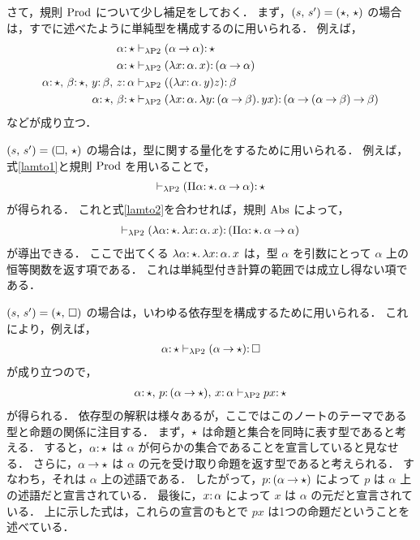 \documentclass[./main]{subfiles}
\begin{document}
さて，規則 $ \mathop{\mathrm{Prod}}\nolimits $ について少し補足をしておく．
まず，$ (s,\, s') = (\mathord{\star},\, \mathord{\star}) $ の場合は，すでに述べたように単純型を構成するのに用いられる．
例えば，
\begin{align}
\alpha \ocl\, \typstar & \vdash _{\lam \mathrm{P2}} (\alpha \bto \alpha) \ocl\, \typstar \label{lamto1} \\
\alpha \ocl\, \typstar & \vdash _{\lam \mathrm{P2}} (\lam x \ocl\, \alpha.\, x) \ocl\, (\alpha \bto \alpha) \label{lamto2} \\
\alpha \ocl\, \typstar,\ats \beta \ocl\, \typstar,\ats y \ocl\, \beta,\ats z \ocl\, \alpha & \vdash _{\lam \mathrm{P2}} ((\lam x \ocl\, \alpha.\, y) z) \ocl\, \beta \notag \\
\alpha \ocl\, \typstar,\ats \beta \ocl\, \typstar & \vdash _{\lam \mathrm{P2}} (\lam x \ocl\, \alpha.\, \lam y \ocl\, (\alpha \bto \beta).\, yx) \ocl\, (\alpha \bto (\alpha \bto \beta) \bto \beta) \notag
\end{align}
などが成り立つ．

$ (s,\, s') = (\mathord{\square},\, \mathord{\star}) $ の場合は，型に関する量化をするために用いられる．
例えば，式\ref{lamto1}と規則 $ \mathop{\mathrm{Prod}}\nolimits $ を用いることで，
\begin{gather*}
\vdash _{\lam \mathrm{P2}} (\Pi \alpha \ocl\, \typstar.\, \alpha \bto \alpha) \ocl\, \typstar \label{quanttype}
\end{gather*}
が得られる．
これと式\ref{lamto2}を合わせれば，規則 $ \mathop{\mathrm{Abs}}\nolimits $ によって，
\begin{gather*}
\vdash _{\lambda \mathrm{P2}} (\lambda \alpha \mathord{:}\, \mathord{\star}.\, \lambda x \mathord{:}\, \alpha.\, x) \mathord{:}\, (\Pi \alpha \mathord{:}\, \mathord{\star}.\, \alpha \mathbin{\to} \alpha) 
\end{gather*}
が導出できる．
ここで出てくる $ \lambda \alpha \mathord{:}\, \mathord{\star}.\, \lambda x \mathord{:}\, \alpha.\, x $ は，型 $ \alpha $ を引数にとって $ \alpha $ 上の恒等関数を返す項である．
これは単純型付き計算の範囲では成立し得ない項である．

$ (s,\, s') = (\mathord{\star},\, \mathord{\square}) $ の場合は，いわゆる依存型を構成するために用いられる． 
これにより，例えば，
\begin{gather*}
\alpha \mathord{:}\, \mathord{\star} \vdash _{\lambda \mathrm{P2}} (\alpha \mathbin{\to} \mathord{\star}) \mathord{:}\, \mathord{\square}
\end{gather*}
が成り立つので，
\begin{gather*}
\alpha \mathord{:}\, \mathord{\star},\, p \mathord{:}\, (\alpha \mathbin{\to} \mathord{\star}),\, x \mathord{:}\, \alpha \vdash _{\lambda \mathrm{P2}} px \mathord{:}\, \mathord{\star}
\end{gather*}
が得られる．
依存型の解釈は様々あるが，ここではこのノートのテーマである型と命題の関係に注目する．
まず，$ \mathord{\star} $ は命題と集合を同時に表す型であると考える．
すると，$ \alpha \mathord{:}\, \mathord{\star} $ は $ \alpha $ が何らかの集合であることを宣言していると見なせる．
さらに，$ \alpha \mathbin{\to} \mathord{\star} $ は $ \alpha $ の元を受け取り命題を返す型であると考えられる．
すなわち，それは $ \alpha $ 上の述語である．
したがって，$ p \mathord{:}\, (\alpha \mathbin{\to} \mathord{\star}) $ によって $ p  $ は $ \alpha $ 上の述語だと宣言されている．
最後に，$ x \mathord{:}\, \alpha $ によって $ x $ は $ \alpha $ の元だと宣言されている．
上に示した式は，これらの宣言のもとで $ px $ は1つの命題だということを述べている．
\end{document}
